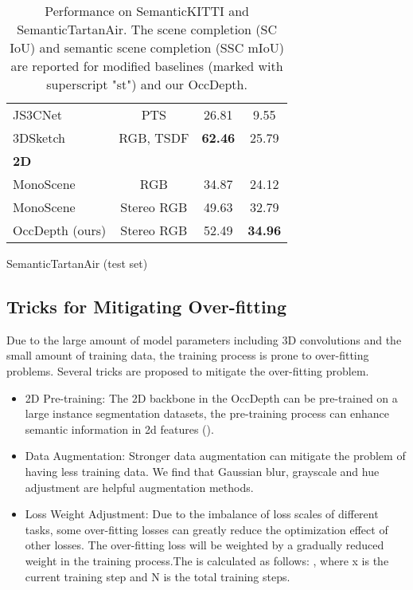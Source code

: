 \documentclass{article}
\begin{document}
\begin{table}[!t]
\begin{subtable}[!]{0.5\textwidth}
{\begin{tabular}{l|c|c|c}
					JS3CNet&PTS &26.81 & 9.55\\
                        3DSketch&RGB, TSDF &\textbf{62.46} &25.79\\
				\midrule
                    \textbf{2D}&&&\\	
                    MonoScene&RGB&34.87&24.12 \\
					MonoScene&Stereo RGB&49.63&32.79 \\
					OccDepth (ours)&Stereo RGB&52.49&\textbf{34.96}\\
					\bottomrule
			\end{tabular}}
			\caption{SemanticTartanAir (test set)}
			\label{mainResults2}
		\end{subtable}
		\caption{Performance on SemanticKITTI and SemanticTartanAir. The scene completion (SC IoU) and semantic scene completion (SSC mIoU) are reported for modified baselines (marked with superscript "st") and our OccDepth.}
		\label{mainResults}
	\end{table}	
	\subsection{Tricks for Mitigating Over-fitting}
	\label{sectionTMO}
	Due to the large amount of model parameters including 3D convolutions and the small amount of training data, the training process is prone to over-fitting problems.
	Several tricks are proposed to mitigate the over-fitting problem.  
	\begin{itemize}
		\item 2D Pre-training: The 2D backbone in the OccDepth can be pre-trained on a large instance segmentation datasets, the pre-training process can enhance semantic information in 2d features ().
		\item Data Augmentation: Stronger data augmentation can mitigate the problem of having less training data. We find that Gaussian blur, grayscale and hue adjustment are helpful augmentation methods.
		\item Loss Weight Adjustment: Due to the imbalance of loss scales of different tasks, some over-fitting losses can greatly reduce the optimization effect of other losses. The over-fitting loss  will be weighted by a gradually reduced weight  in the training process.The  is calculated as follows: , where x is the current training step and N is the total training steps.
	\end{itemize}
\end{document}
